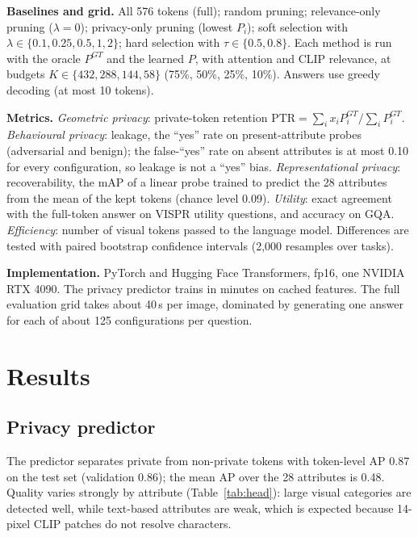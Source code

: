 \documentclass{article}
\begin{document}
\textbf{Baselines and grid.} All 576 tokens (full); random pruning; relevance-only pruning ($\lambda=0$); privacy-only pruning (lowest $P_i$);
soft selection with $\lambda\in\{0.1,0.25,0.5,1,2\}$; hard selection with $\tau\in\{0.5,0.8\}$. Each method is run with the oracle $P^{GT}$ and the learned $P$,
with attention and CLIP relevance, at budgets $K\in\{432, 288, 144, 58\}$ (75\%, 50\%, 25\%, 10\%). Answers use greedy decoding (at most 10 tokens).

\textbf{Metrics.}
\emph{Geometric privacy}: private-token retention $\mathrm{PTR}=\sum_i x_iP^{GT}_i/\sum_iP^{GT}_i$.
\emph{Behavioural privacy}: leakage, the ``yes'' rate on present-attribute probes (adversarial and benign); the false-``yes'' rate on absent attributes is
at most 0.10 for every configuration, so leakage is not a ``yes'' bias.
\emph{Representational privacy}: recoverability, the mAP of a linear probe trained to predict the 28 attributes from the mean of the kept tokens (chance level 0.09).
\emph{Utility}: exact agreement with the full-token answer on VISPR utility questions, and accuracy on GQA.
\emph{Efficiency}: number of visual tokens passed to the language model.
Differences are tested with paired bootstrap confidence intervals (2,000 resamples over tasks).

\textbf{Implementation.} PyTorch and Hugging Face Transformers, fp16, one NVIDIA RTX 4090. The privacy predictor trains in minutes on cached features.
The full evaluation grid takes about 40\,s per image, dominated by generating one answer for each of about 125 configurations per question.

\section{Results}\label{sec:results}

\subsection{Privacy predictor}
The predictor separates private from non-private tokens with token-level AP 0.87 on the test set (validation 0.86); the mean AP over the 28 attributes is 0.48.
Quality varies strongly by attribute (Table~\ref{tab:head}): large visual categories are detected well, while text-based attributes are weak, which is expected
because 14-pixel CLIP patches do not resolve characters.
\end{document}
